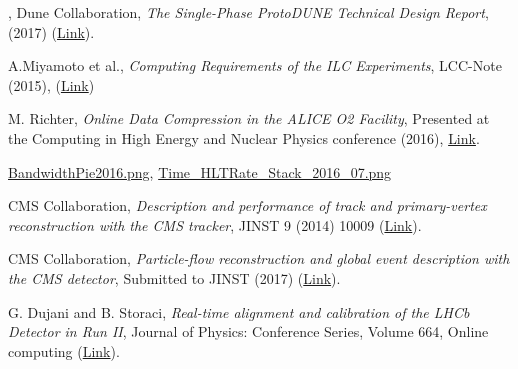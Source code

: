 \documentclass[11pt,letterpaper,fleqn]{article}
\begin{document}
\begin{thebibliography}{99}
, 
Dune Collaboration, 
\textit{The Single-Phase ProtoDUNE Technical Design Report},
(2017) (\href{https://arxiv.org/abs/1706.07081}{Link}). 

A.Miyamoto et al., 
\textit{Computing Requirements of the ILC Experiments}, 
LCC-Note (2015), (\href{http://www-jlc.kek.jp/~miyamoto/SoftwareCommonTask/docs/ILCComputing-EDMS1130485.A.1.1.pdf}{Link})

M. Richter, 
\textit{Online Data Compression in the ALICE O2 Facility}, 
Presented at the Computing in High Energy and Nuclear Physics conference (2016),
\href{https://indico.cern.ch/event/505613/contributions/2227264/}{Link}.

\href{https://twiki.cern.ch/twiki/pub/AtlasPublic/TriggerOperationPublicResults/BandwidthPie2016.png}{BandwidthPie2016.png}, 
\href{https://twiki.cern.ch/twiki/pub/AtlasPublic/TriggerOperationPublicResults/Time_HLTRate_Stack_2016_07.png}{Time\_HLTRate\_Stack\_2016\_07.png}

CMS Collaboration, 
\textit{Description and performance of track and primary-vertex reconstruction with the CMS tracker},  
JINST 9 (2014) 10009 (\href{http://cds.cern.ch/record/1704291}{Link}). 

CMS Collaboration, 
\textit{Particle-flow reconstruction and global event description with the CMS detector}, 
Submitted to JINST (2017) (\href{https://arxiv.org/abs/1706.04965}{Link}).

G. Dujani and B. Storaci, 
\textit{Real-time alignment and calibration of the LHCb Detector in Run II}, 
Journal of Physics: Conference Series, Volume 664, Online computing (\href{https://cds.cern.ch/record/2017839?ln=en}{Link}).

 










\end{thebibliography}


\end{document}
